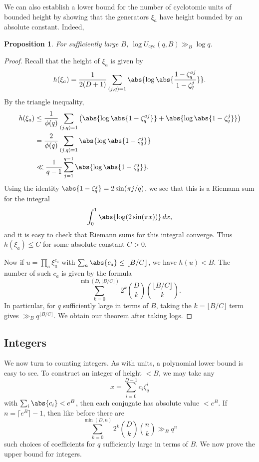 \documentclass{article}
\newtheorem{prop}{Proposition}
\DeclareMathOperator{\cyc}{cyc}
\begin{document}
We can also establish a lower bound for the number of cyclotomic units of bounded height by showing that the generators $\xi_a$ have height bounded by an absolute constant. Indeed,

\begin{prop}
    For sufficiently large $B$, $\log U_{\cyc}(q,B) \gg_B \log q$.
\end{prop}
\begin{proof}
    Recall that the height of $\xi_a$ is given by
\[
h(\xi_a) = \frac{1}{2(D+1)} \sum_{(j,q)=1} \abs{\log \abs{\frac{1-\zeta_q^{aj}}{1-\zeta_q^j}}}.
\]
By the triangle inequality,
\begin{align*}
h(\xi_a) &\leq \frac{1}{\phi(q)} \sum_{(j,q)=1} \left( \abs{\log \abs{1-\zeta_q^{aj}}} + \abs{\log \abs{1-\zeta_q^j}} \right) \\
&= \frac{2}{\phi(q)} \sum_{(j,q)=1} \abs{\log \abs{1-\zeta_q^j}} \\
&\ll \frac{1}{q-1}
\sum_{j=1}^{q-1} \abs{\log \abs{1-\zeta_q^j}}.
\end{align*}
Using the identity $\abs{1-\zeta_q^j} = 2\sin(\pi j/q)$, we see that this is a Riemann sum for the integral
\[
\int_0^1 \abs{\log(2\sin(\pi x))} \, dx,
\]
and it is easy to check that Riemann sums for this integral converge. Thus $h(\xi_a) \leq C$ for some absolute constant $C > 0$.

Now if $u = \prod_a \xi_a^{c_a}$ with $\sum_a \abs{c_a} \leq \lfloor B/C \rfloor$, we have $h(u) < B$. The number of such $c_a$ is given by the formula
\[
\sum_{k=0}^{\min(D,\lfloor B/C \rfloor)} 2^k \binom{D}{k} \binom{\lfloor B/C \rfloor}{k}.
\]
In particular, for $q$ sufficiently large in terms of $B$, taking the $k=\lfloor B/C \rfloor$ term gives $\gg_B q^{\lfloor B/C \rfloor}$. We obtain our theorem after taking logs.

\end{proof}

\subsection{Integers}
We now turn to counting integers. As with units, a polynomial lower bound is easy to see. To construct an integer of height $< B$, we may take any
\[
x = \sum_{i=0}^{D-1} c_i \zeta_q^i
\]
with $\sum_i \abs{c_i} < e^B$, then each conjugate has absolute value $< e^B$. If $n=\lceil e^B\rceil-1$, then like before there are
\[
\sum_{k=0}^{\min(D,n)} 2^k \binom{D}{k}\binom{n}{k} \gg_B q^n
\]
such choices of coefficients for $q$ sufficiently large in terms of $B$. We now prove the upper bound for integers.
\end{document}
